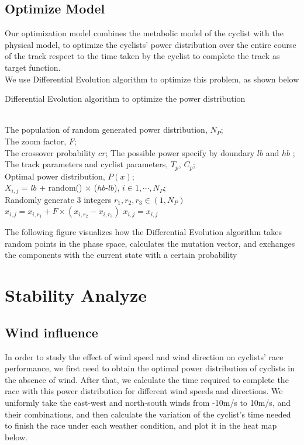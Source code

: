 \documentclass{mcmthesis}
\begin{document}
  \subsection{Optimize Model}
  Our optimization model combines the metabolic model of the cyclist with the physical model, to optimize the cyclists' power distribution over the entire course of the track respect to the time taken by the cyclist to complete the track as target function.\\ We use Differential Evolution algorithm to optimize this problem, as shown below
  \begin{algorithm}
    \caption{Differential Evolution algorithm to optimize the power distribution}
    \label{alg:DE}
    \begin{algorithmic}
      \REQUIRE ~~\\
      The population of random generated power distribution, $N_P$;\\
      The zoom factor,  $F$;\\
      The crossover probability $cr$;
      The possible power specify by doundary $lb$ and $hb$ ;\\
      The track parameters and cyclist parameters, $T_p$, $C_p$;
      \ENSURE ~~\\
      Optimal power distribution, $P(x)$;\\
      $X_{i,j}$ = $lb$ + random() $\times$ ($hb$-$lb$), $i\in 1,\cdots,N_P$;\\
      \STATE Randomly generate 3 integers $r_1, r_2, r_3\in (1,N_P)$
      \STATE $x_{i,j} = x_{i,r_1} + F\times (x_{i,r_2} - x_{i,r_3})$
      \ELSE
      \STATE $x_{i,j} = x_{i,j}$
      \ENDIF
      \ENDFOR
      \ENDFOR
      \ENDWHILE
    \end{algorithmic}
  \end{algorithm}
  The following figure visualizes how the Differential Evolution algorithm takes random points in the phase space, calculates the mutation vector, and exchanges the components with the current state with a certain probability


  \section{Stability Analyze}
  \subsection{Wind influence}
  In order to study the effect of wind speed and wind direction on cyclists' race performance, we first need to obtain the optimal power distribution of cyclists in the absence of wind. After that, we calculate the time required to complete the race with this power distribution for different wind speeds and directions. We uniformly take the east-west and north-south winds from -10m/s to 10m/s, and their combinations, and then calculate the variation of the cyclist's time needed to finish the race under each weather condition, and plot it in the heat map below.
  
  
\end{document}
